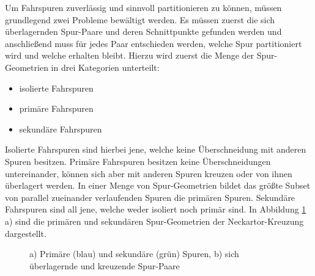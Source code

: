 Um Fahrspuren zuverlässig und sinnvoll partitionieren zu können, müssen grundlegend zwei Probleme bewältigt
werden. Es müssen zuerst die sich überlagernden Spur-Paare und deren Schnittpunkte gefunden werden und
anschließend muss für jedes Paar entschieden werden, welche Spur partitioniert wird und welche erhalten bleibt.
Hierzu wird zuerst die Menge der Spur-Geometrien in drei Kategorien unterteilt:

\begin{itemize}
    \item isolierte Fahrspuren
    \item primäre Fahrspuren
    \item sekundäre Fahrspuren
\end{itemize}

Isolierte Fahrspuren sind hierbei jene, welche keine Überschneidung mit anderen Spuren besitzen. Primäre
Fahrspuren besitzen keine Überschneidungen untereinander, können sich aber mit anderen Spuren kreuzen oder
von ihnen überlagert werden. In einer Menge von Spur-Geometrien bildet das größte Subset von parallel
zueinander verlaufenden Spuren die primären Spuren. Sekundäre Fahrspuren sind all jene, welche
weder isoliert noch primär sind. In Abbildung \ref{fig:real2_prim_and_sec_lanes} a) sind die primären und
sekundären Spur-Geometrien der Neckartor-Kreuzung dargestellt.

\begin{figure}[H]
    \centering
    \qquad
    \caption{a) Primäre (blau) und sekundäre (grün) Spuren, b) sich überlagernde und kreuzende Spur-Paare}
    \label{fig:real2_prim_and_sec_lanes}
\end{figure}

